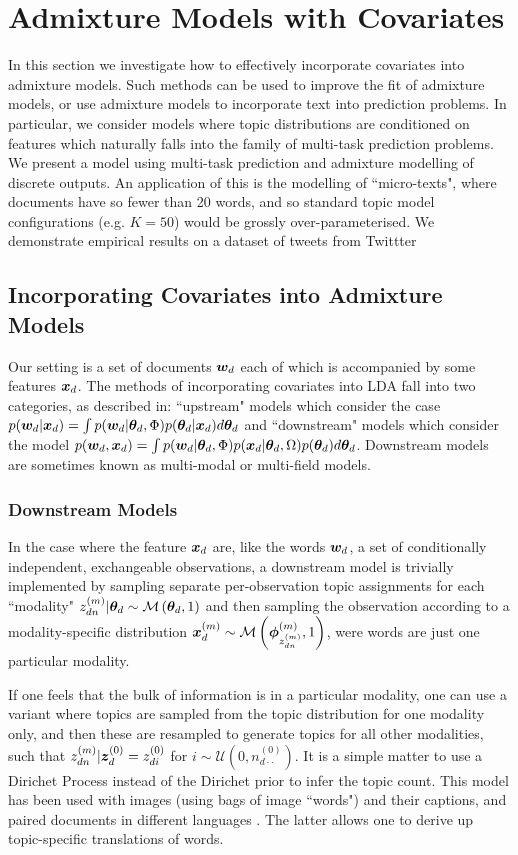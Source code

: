 
\section{Admixture Models with Covariates}
In this section we investigate how to effectively incorporate covariates into admixture models. Such methods can be used to improve the fit of admixture models, or use admixture models to incorporate text into prediction problems. In particular, we consider models where topic distributions are conditioned on features which naturally falls into the family of multi-task prediction problems. We present a model using multi-task prediction and admixture modelling of discrete outputs. An application of this is the modelling of ``micro-texts", where documents have so fewer than 20 words, and so standard topic model configurations (e.g. $K=50$) would be grossly over-parameterised. We demonstrate empirical results on a dataset of tweets from Twittter

\subsection{Incorporating Covariates into Admixture Models}
Our setting is a set of documents $\bm w_d$ each of which is accompanied by some features $\bm x_d$. The methods of incorporating covariates into LDA fall into two categories, as described in\cite{Mimno2008}: ``upstream" models which consider the case $p({ \bm w_d } | { \bm x_d }) = \int p({ \bm w_d }|{ \bm \theta_d }, \Phi)p({ \bm \theta_d }|{ \bm x_d }) d{ \bm \theta_d }$ 
and ``downstream" models which consider the model $p({ \bm w_d }, { \bm x_d }) = \int p({ \bm w_d }|{ \bm \theta_d }, \Phi)p({ \bm x_d }|{ \bm \theta_d }, \Omega)p({ \bm \theta_d })d{ \bm \theta_d }$. Downstream models are sometimes known as multi-modal\cite{Virtanen2012a} or multi-field\cite{Salomatin2009} models.

\subsubsection{Downstream Models}
In the case where the feature ${ \bm x_d }$ are, like the words ${ \bm w_d }$, a set of conditionally independent, exchangeable observations, a downstream model is trivially implemented\cite{Erosheva2004}\cite{Blei2003} by sampling separate per-observation topic assignments for each ``modality" $z_{dn}^{(m)}|{ \bm \theta_d } \sim \mathcal{M} \left( {{ \bm \theta_d }},{1} \right)$ and then sampling the observation according to a modality-specific distribution $\bm x_d^{(m)} \sim \mathcal{M} \left( {\bm \phi^{(m)}_{z^{(m)}_{dn}}},{1} \right)$, were words are just one particular modality.

If one feels that the bulk of information is in a particular modality, one can use a variant\cite{Blei2003} where topics are sampled from the topic distribution for one modality only, and then these are resampled to generate topics for all other modalities, such that $z_{dn}^{(m)}|\bm z_d^{(0)} = z_{di}^{(0)}$ for $i \sim \mathcal{U}(0, n_{d\cdot\cdot}^{(0)})$. It is a simple matter to use a Dirichet Process instead of the Dirichet prior to infer the topic count\cite{Yakhnenko2009}. This model has been used with images (using bags of image ``words") and their captions\cite{Blei2003}, and paired documents in different languages \cite{Zhao2001}. The latter allows one to derive up topic-specific translations of words.

